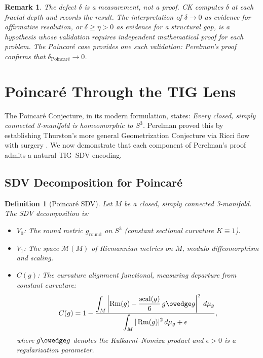 \documentclass[11pt]{article}
\newtheorem{definition}[theorem]{Definition}
\newtheorem{remark}[theorem]{Remark}
\DeclareMathOperator{\Rm}{Rm}
\DeclareMathOperator{\scal}{scal}
\begin{document}
\begin{remark}
The defect $\delta$ is a measurement, not a proof.  CK computes
$\delta$ at each fractal depth and records the result.  The
\emph{interpretation} of $\delta \to 0$ as evidence for affirmative
resolution, or $\delta \geq \eta > 0$ as evidence for a structural
gap, is a hypothesis whose validation requires independent mathematical
proof for each problem.  The Poincar\'e case provides one such
validation: Perelman's proof confirms that $\delta_{\text{Poincar\'e}}
\to 0$.
\end{remark}

\section{Poincar\'e Through the TIG Lens}
\label{sec:poincare}

The Poincar\'e Conjecture, in its modern formulation, states:
\emph{Every closed, simply connected 3-manifold is homeomorphic to
$S^3$.}  Perelman proved this by establishing Thurston's more general
Geometrization Conjecture via Ricci flow with surgery
\cite{Per1,Per2,Per3}.  We now demonstrate that each component of
Perelman's proof admits a natural TIG--SDV encoding.

\subsection{SDV Decomposition for Poincar\'e}
\label{subsec:poinc-sdv}

\begin{definition}[Poincar\'e SDV]
\label{def:poinc-sdv}
Let $M$ be a closed, simply connected 3-manifold.  The SDV
decomposition is:
\begin{itemize}
\item $V_0$: The round metric $g_{\mathrm{round}}$ on $S^3$
(constant sectional curvature $K \equiv 1$).
\item $V_1$: The space $\mathcal{M}(M)$ of Riemannian metrics on $M$,
modulo diffeomorphism and scaling.
\item $C(g)$: The curvature alignment functional, measuring departure
from constant curvature:
\[
C(g) = 1 - \frac{\displaystyle\int_M \left|\Rm(g)
    - \frac{\scal(g)}{6}\, g \owedge g\right|^2 \, d\mu_g}
{\displaystyle\int_M |\Rm(g)|^2 \, d\mu_g + \epsilon},
\]
where $g \owedge g$ denotes the Kulkarni--Nomizu product and
$\epsilon > 0$ is a regularization parameter.
\end{itemize}
\end{definition}
\end{document}

